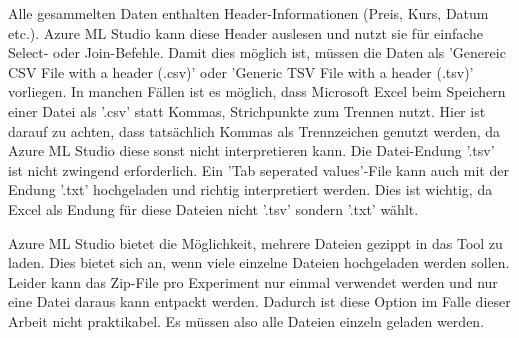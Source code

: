 Alle gesammelten Daten enthalten Header-Informationen (Preis, Kurs, Datum etc.). Azure ML Studio kann diese Header auslesen und nutzt sie für einfache Select- oder Join-Befehle. Damit dies möglich ist, müssen die Daten als 'Genereic CSV File with a header (.csv)' oder 'Generic TSV File with a header (.tsv)' vorliegen. In manchen Fällen ist es möglich, dass Microsoft Excel beim Speichern einer Datei als '.csv' statt Kommas, Strichpunkte zum Trennen nutzt. Hier ist darauf zu achten, dass tatsächlich Kommas als Trennzeichen genutzt werden, da Azure ML Studio diese sonst nicht interpretieren kann. Die Datei-Endung '.tsv' ist nicht zwingend erforderlich. Ein 'Tab seperated values'-File kann auch mit der Endung '.txt' hochgeladen und richtig interpretiert werden. Dies ist wichtig, da Excel als Endung für diese Dateien nicht '.tsv' sondern '.txt' wählt.\newline

Azure ML Studio bietet die Möglichkeit, mehrere Dateien gezippt in das Tool zu laden. Dies bietet sich an, wenn viele einzelne Dateien hochgeladen werden sollen. Leider kann das Zip-File pro Experiment nur einmal verwendet werden und nur eine Datei daraus kann entpackt werden. Dadurch ist diese Option im Falle dieser Arbeit nicht praktikabel. Es müssen also alle Dateien einzeln geladen werden.

